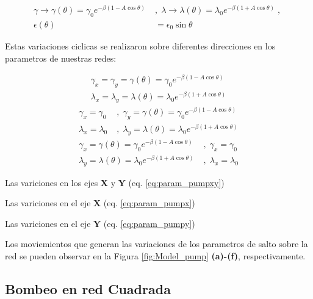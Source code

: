 \begin{align}
    \label{eq:param_pump}
    \nonumber\gamma \rightarrow \gamma (\theta) = \gamma_0 e^{\displaystyle-\beta(1 - A \cos \theta )} \; &,\;  \lambda \rightarrow \lambda(\theta) = \lambda_0 e^{\displaystyle-\beta( 1 + A \cos \theta )} \;,\; \\  \epsilon(\theta) &= \epsilon_0 \sin \theta
\end{align}

Estas variaciones ciclicas se realizaron sobre diferentes direcciones en los parametros de nuestras redes: 

\begin{align}
    \label{eq:param_pumpxy}
    \nonumber \gamma_x = \gamma_y = \gamma (\theta) = \gamma_0 e^{\displaystyle-\beta(1 - A \cos \theta )} \\ \lambda_x = \lambda_y = \lambda(\theta) = \lambda_0 e^{\displaystyle-\beta( 1 + A \cos \theta )}
\end{align}
\begin{align}
    \label{eq:param_pumpx}
    \nonumber \gamma_x =\gamma_0 \; &,\; \gamma_y = \gamma (\theta) = \gamma_0 e^{\displaystyle-\beta(1 - A \cos \theta )} \\
    \lambda_x = \lambda_0  \; &,\;  \lambda_y = \lambda(\theta) = \lambda_0 e^{\displaystyle-\beta( 1 + A \cos \theta )}
\end{align}
\begin{align}
    \label{eq:param_pumpy}
    \nonumber \gamma_x = \gamma (\theta) = \gamma_0 e^{\displaystyle-\beta(1 - A \cos \theta )}   \; &,\; \gamma_x =\gamma_0 \\
    \lambda_y = \lambda(\theta) = \lambda_0 e^{\displaystyle-\beta( 1 + A \cos \theta )} \; &,\; \lambda_x = \lambda_0  
\end{align}

Las variciones en los ejes $\mathbf{X}$ y $\mathbf{Y}$ (eq. \ref{eq:param_pumpxy})


Las variciones en el eje $\mathbf{X}$ (eq. \ref{eq:param_pumpx})


Las variciones en el eje $\mathbf{Y}$ (eq. \ref{eq:param_pumpy})

Los moviemientos que generan las variaciones de los parametros de salto sobre la red se pueden observar en la Figura \ref{fig:Model_pump} \textbf{(a)-(f)}, respectivamente.




\subsection{Bombeo en red Cuadrada}

